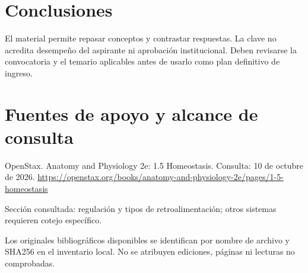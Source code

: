 \section{Conclusiones}
El material permite repasar conceptos y contrastar respuestas. La clave no acredita desempeño del aspirante ni aprobación institucional. Deben revisarse la convocatoria y el temario aplicables antes de usarlo como plan definitivo de ingreso.
\clearpage\section{Fuentes de apoyo y alcance de consulta}
OpenStax. Anatomy and Physiology 2e: 1.5 Homeostasis. Consulta: 10 de octubre de 2026. \url{https://openstax.org/books/anatomy-and-physiology-2e/pages/1-5-homeostasis}\par Sección consultada: regulación y tipos de retroalimentación; otros sistemas requieren cotejo específico.\par\medskip
Los originales bibliográficos disponibles se identifican por nombre de archivo y SHA256 en el inventario local. No se atribuyen ediciones, páginas ni lecturas no comprobadas.

